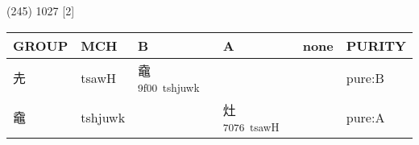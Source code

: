 \documentclass[14pt,a4paper]{scrartcl}
\begin{document}
(245) 1027 {[}2{]}

\begin{longtable}[c]{@{}llllll@{}}
\toprule
\begin{minipage}[b]{0.14\columnwidth}\raggedright\strut
GROUP
\strut\end{minipage} &
\begin{minipage}[b]{0.14\columnwidth}\raggedright\strut
MCH
\strut\end{minipage} &
\begin{minipage}[b]{0.14\columnwidth}\raggedright\strut
B
\strut\end{minipage} &
\begin{minipage}[b]{0.14\columnwidth}\raggedright\strut
A
\strut\end{minipage} &
\begin{minipage}[b]{0.14\columnwidth}\raggedright\strut
none
\strut\end{minipage} &
\begin{minipage}[b]{0.14\columnwidth}\raggedright\strut
PURITY
\strut\end{minipage}\tabularnewline
\midrule
\endhead
\begin{minipage}[t]{0.14\columnwidth}\raggedright\strut
圥
\strut\end{minipage} &
\begin{minipage}[t]{0.14\columnwidth}\raggedright\strut
tsawH
\strut\end{minipage} &
\begin{minipage}[t]{0.14\columnwidth}\raggedright\strut
鼀\textsuperscript{9f00~tshjuwk}
\strut\end{minipage} &
\begin{minipage}[t]{0.14\columnwidth}\raggedright\strut
\strut\end{minipage} &
\begin{minipage}[t]{0.14\columnwidth}\raggedright\strut
\strut\end{minipage} &
\begin{minipage}[t]{0.14\columnwidth}\raggedright\strut
pure:B
\strut\end{minipage}\tabularnewline
\begin{minipage}[t]{0.14\columnwidth}\raggedright\strut
鼀
\strut\end{minipage} &
\begin{minipage}[t]{0.14\columnwidth}\raggedright\strut
tshjuwk
\strut\end{minipage} &
\begin{minipage}[t]{0.14\columnwidth}\raggedright\strut
\strut\end{minipage} &
\begin{minipage}[t]{0.14\columnwidth}\raggedright\strut
灶\textsuperscript{7076~tsawH}
\strut\end{minipage} &
\begin{minipage}[t]{0.14\columnwidth}\raggedright\strut
\strut\end{minipage} &
\begin{minipage}[t]{0.14\columnwidth}\raggedright\strut
pure:A
\strut\end{minipage}\tabularnewline
\bottomrule
\end{longtable}
\end{document}
